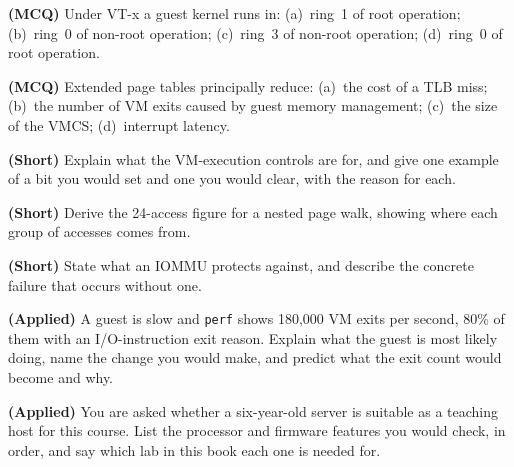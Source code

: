 \begin{reviewq}
  \item \textbf{(MCQ)} Under VT-x a guest kernel runs in: (a)~ring~1 of root
        operation; (b)~ring~0 of non-root operation; (c)~ring~3 of non-root
        operation; (d)~ring~0 of root operation.
  \item \textbf{(MCQ)} Extended page tables principally reduce: (a)~the cost of
        a TLB miss; (b)~the number of VM exits caused by guest memory
        management; (c)~the size of the VMCS; (d)~interrupt latency.
  \item \textbf{(Short)} Explain what the VM-execution controls are for, and
        give one example of a bit you would set and one you would clear, with
        the reason for each.
  \item \textbf{(Short)} Derive the 24-access figure for a nested page walk,
        showing where each group of accesses comes from.
  \item \textbf{(Short)} State what an IOMMU protects against, and describe the
        concrete failure that occurs without one.
  \item \textbf{(Applied)} A guest is slow and \texttt{perf} shows 180{,}000 VM
        exits per second, 80\% of them with an I/O-instruction exit reason.
        Explain what the guest is most likely doing, name the change you would
        make, and predict what the exit count would become and why.
  \item \textbf{(Applied)} You are asked whether a six-year-old server is
        suitable as a teaching host for this course. List the processor and
        firmware features you would check, in order, and say which lab in this
        book each one is needed for.
\end{reviewq}
